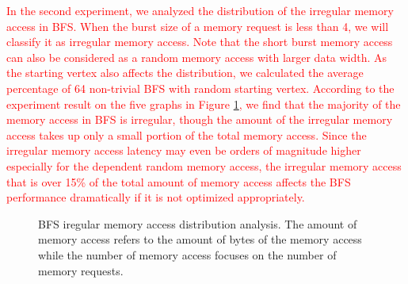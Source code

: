 \textcolor{red}{
In the second experiment, we analyzed the distribution of the irregular memory access in BFS. 
When the burst size of a memory request is less than 4, we will classify 
it as irregular memory access. Note that the short burst memory access can also be considered as 
a random memory access with larger data width. As the starting vertex also affects the distribution, 
we calculated  the average percentage of 64 non-trivial BFS with random starting vertex. 
According to the experiment result on the five graphs 
in Figure \ref{fig:bfs-mem-dist}, we find that the majority of the memory access in BFS is irregular, 
though the amount of the irregular memory access takes up only a small portion of the total memory access. 
Since the irregular memory access latency may even be orders of magnitude higher 
especially for the dependent random memory access, the irregular memory access that is over 15\% of 
the total amount of memory access affects the BFS performance dramatically if it is not 
optimized appropriately. }
\begin{figure}
    \caption{BFS iregular memory access distribution analysis. The amount of memory access refers to the amount of 
	bytes of the memory access while the number of memory access focuses on the number of memory requests.}
\label{fig:bfs-mem-dist}
\vspace{-0.5em}
\end{figure}

